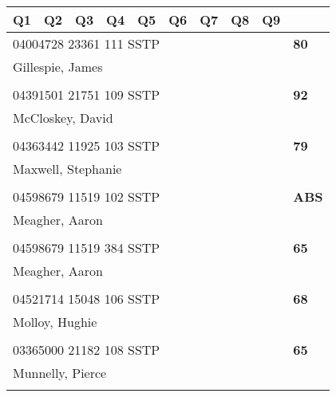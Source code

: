 \documentclass[a4paper,12pt]{article}
\begin{document}
\begin{tabular}{
   |p{9mm}|
    p{9mm}|
    p{9mm}|
    p{9mm}|
    p{9mm}|
    p{9mm}|
    p{9mm}|
    p{9mm}|
    p{9mm}|
    p{9mm}|}
\hline\hline
Q1 & Q2 & Q3 & Q4 & Q5 & Q6 & Q7 & Q8 & Q9 &     \\
\hline\hline
\multicolumn{9}{|l|}{04004728 23361 111 SSTP} & \textbf{80} \\
\hline
\multicolumn{10}{|l|}{Gillespie, James} \\
\hline
   \vrule height8mm width0pt depth2mm 
      &    &    &    &    &    &    &    &    &     \\
\hline\hline
\multicolumn{9}{|l|}{04391501 21751 109 SSTP} & \textbf{92} \\
\hline
\multicolumn{10}{|l|}{McCloskey, David} \\
\hline
   \vrule height8mm width0pt depth2mm 
      &    &    &    &    &    &    &    &    &     \\
\hline\hline
\multicolumn{9}{|l|}{04363442 11925 103 SSTP} & \textbf{79} \\
\hline
\multicolumn{10}{|l|}{Maxwell, Stephanie} \\
\hline
   \vrule height8mm width0pt depth2mm 
      &    &    &    &    &    &    &    &    &     \\
\hline\hline
\multicolumn{9}{|l|}{04598679 11519 102 SSTP} & \textbf{ABS} \\
\hline
\multicolumn{10}{|l|}{Meagher, Aaron} \\
\hline
   \vrule height8mm width0pt depth2mm 
      &    &    &    &    &    &    &    &    &     \\
\hline\hline
\multicolumn{9}{|l|}{04598679 11519 384 SSTP} & \textbf{65} \\
\hline
\multicolumn{10}{|l|}{Meagher, Aaron} \\
\hline
   \vrule height8mm width0pt depth2mm 
      &    &    &    &    &    &    &    &    &     \\
\hline\hline
\multicolumn{9}{|l|}{04521714 15048 106 SSTP} & \textbf{68} \\
\hline
\multicolumn{10}{|l|}{Molloy, Hughie} \\
\hline
   \vrule height8mm width0pt depth2mm 
      &    &    &    &    &    &    &    &    &     \\
\hline\hline
\multicolumn{9}{|l|}{03365000 21182 108 SSTP} & \textbf{65} \\
\hline
\multicolumn{10}{|l|}{Munnelly, Pierce} \\
\hline
   \vrule height8mm width0pt depth2mm 

\end{tabular}
\end{document}
